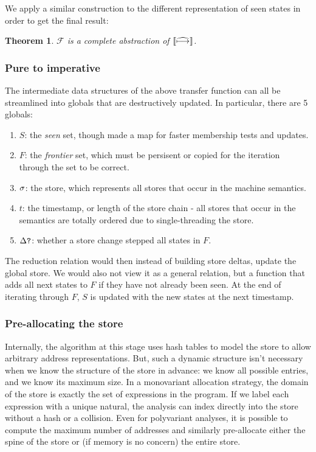 \documentclass[preprint,onecolumn,9pt]{sigplanconf} %
\newtheorem{theorem}{Theorem}
\begin{document}
We apply a similar construction to the different representation of seen states in order to get the final result:

\begin{theorem}
${\mathcal F}$ is a complete abstraction of $\mathbin{\llbracket\widehat{\mathbin{\longmapsto}}\rrbracket}$.
\end{theorem}

\subsubsection{Pure to imperative}

The intermediate data structures of the above transfer function can all be streamlined into globals that are destructively updated. In particular, there are 5 globals:

\begin{enumerate}
\item{$S$: the \emph{seen} set, though made a map for faster membership tests and updates.}
\item{$F$: the \emph{frontier} set, which must be persisent or copied for the iteration through the set to be correct.}
\item{$\sigma$: the store, which represents all stores that occur in the machine semantics.}
\item{$t$: the timestamp, or length of the store chain - all stores that occur in the semantics are totally ordered due to single-threading the store.}
\item{$\Delta\mbox{{\tt ?}}$: whether a store change stepped all states in $F$.}
\end{enumerate}

The reduction relation would then instead of building store deltas,
update the global store. We would also not view it as a general
relation, but a function that adds all next states to $F$ if they have
not already been seen. At the end of iterating through $F$, $S$ is
updated with the new states at the next timestamp.

\subsubsection{Pre-allocating the store}

Internally, the algorithm at this stage uses hash tables to model the store to allow arbitrary address representations.
%
But, such a dynamic structure isn't necessary when we know the
structure of the store in advance: we know all possible entries, and
we know its maximum size.
%
In a monovariant allocation strategy, the domain of the store is
exactly the set of expressions in the program.
%
If we label each expression with a unique natural, the analysis can
index directly into the store without a hash or a collision.
%
Even for polyvariant analyses, it is possible to compute the maximum
number of addresses and similarly pre-allocate either the spine of the
store or (if memory is no concern) the entire store.
\end{document}
